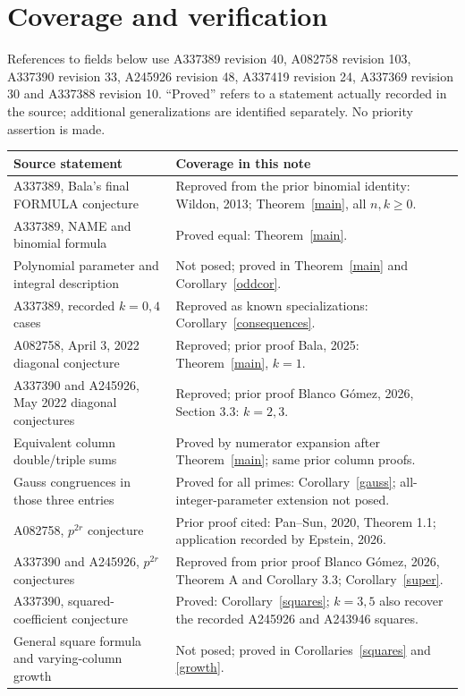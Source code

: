 \documentclass[11pt]{article}
\begin{document}
\section{Coverage and verification}
References to fields below use A337389 revision 40, A082758 revision 103,
A337390 revision 33, A245926 revision 48, A337419 revision 24,
A337369 revision 30 and A337388 revision 10. ``Proved'' refers to a
statement actually recorded in the source; additional generalizations
are identified separately. No priority assertion is made.
\begingroup\small
\begin{longtable}{@{}p{.43\linewidth}p{.53\linewidth}@{}}
\toprule
Source statement & Coverage in this note\\\midrule
A337389, Bala's final FORMULA conjecture & Reproved from the prior binomial identity: Wildon, 2013; Theorem~\ref{main}, all $n,k\geq0$.\\
A337389, NAME and binomial formula & Proved equal: Theorem~\ref{main}.\\
Polynomial parameter and integral description & Not posed; proved in Theorem~\ref{main} and Corollary~\ref{oddcor}.\\
A337389, recorded $k=0,4$ cases & Reproved as known specializations: Corollary~\ref{consequences}.\\
A082758, April 3, 2022 diagonal conjecture & Reproved; prior proof Bala, 2025: Theorem~\ref{main}, $k=1$.\\
A337390 and A245926, May 2022 diagonal conjectures & Reproved; prior proof Blanco G\'omez, 2026, Section 3.3: $k=2,3$.\\
Equivalent column double/triple sums & Proved by numerator expansion after Theorem~\ref{main}; same prior column proofs.\\
Gauss congruences in those three entries & Proved for all primes: Corollary~\ref{gauss}; all-integer-parameter extension not posed.\\
A082758, $p^{2r}$ conjecture & Prior proof cited: Pan--Sun, 2020, Theorem 1.1; application recorded by Epstein, 2026.\\
A337390 and A245926, $p^{2r}$ conjectures & Reproved from prior proof Blanco G\'omez, 2026, Theorem A and Corollary 3.3; Corollary~\ref{super}.\\
A337390, squared-coefficient conjecture & Proved: Corollary~\ref{squares}; $k=3,5$ also recover the recorded A245926 and A243946 squares.\\
General square formula and varying-column growth & Not posed; proved in Corollaries~\ref{squares} and \ref{growth}.\\

\end{longtable}
\end{document}
